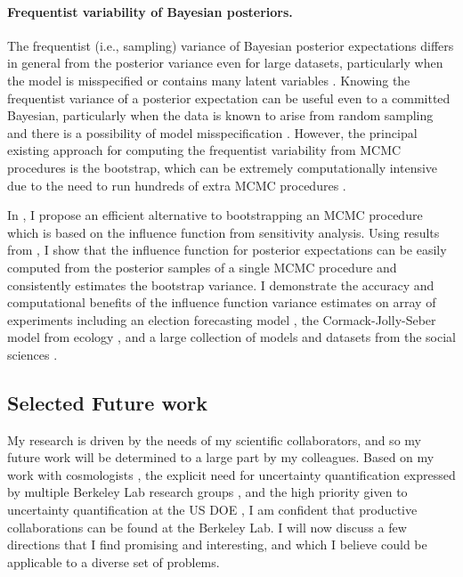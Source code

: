 \paragraph{Frequentist variability of Bayesian posteriors.}

The frequentist (i.e., sampling) variance of Bayesian posterior expectations
differs in general from the posterior variance even for large datasets,
particularly when the model is misspecified or contains many latent variables
\citep{kleijn:2006:misspecification}.
Knowing the frequentist variance of a posterior expectation can be useful even
to a committed Bayesian, particularly when the data is known to arise from
random sampling and there is a possibility of model misspecification
\citep{waddell:2002:bayesphyloboot}.  However, the
principal existing approach for computing the frequentist variability from MCMC
procedures is the bootstrap, which can be extremely computationally intensive
due to the need to run hundreds of extra MCMC procedures
\citep{huggins:2019:bayesbag}.

In \citep{giordano:2020:bayesij, giordano:2020:stanconbayesij}, I propose an
efficient alternative to bootstrapping an MCMC procedure which is based on the
influence function from sensitivity analysis.  Using results from
\citep{giordano:2018:covariances, giordano:2019:ij}, I show that the influence
function for posterior expectations can be easily computed from the posterior
samples of a single MCMC procedure and consistently estimates the bootstrap
variance. I demonstrate the accuracy and computational benefits of the influence
function variance estimates on array of experiments including an election
forecasting model \citep{economist:2020:election}, the Cormack-Jolly-Seber model
from ecology \citep{kery:2011:bayesian}, and a large collection of models and
datasets from the social sciences \citep{gelman:2006:arm}.



\subsection*{Selected Future work}

My research is driven by the needs of my scientific collaborators, and so my
future work will be determined to a large part by my colleagues. Based on my
work with cosmologists \citep{regier:2019:cataloging}, the explicit need for
uncertainty quantification expressed by multiple Berkeley Lab research groups
\citep[Section 6.2]{committee:2020:report}, and the high priority given to
uncertainty quantification at the US DOE \citep{lbnl:2019:foa}, I am confident
that productive collaborations can be found at the Berkeley Lab. I will now
discuss a few directions that I find promising and interesting, and which I
believe could be applicable to a diverse set of problems.

